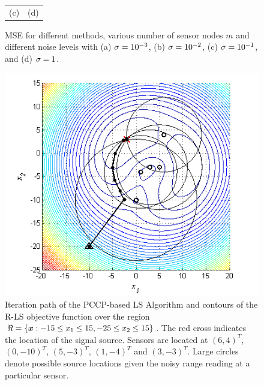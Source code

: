 \begin{figure}[t]
\begin{tabular}{cc}
    \\  (c)&  (d)   \\
\end{tabular}
\caption{MSE for different methods, various number of sensor nodes $m$ and different noise levels with (a) $\protect\sigma = 10\protect^{-3}$, (b) $\protect\sigma = 10\protect^{-2}$, (c) $\protect\sigma = 10\protect^{-1}$, and (d) $\protect\sigma = 1$.} \label{fig:MSE}
\end{figure}

\begin{figure} 
\centering
\includegraphics{figures/ccp/iteration_path2}
\caption{Iteration path of the PCCP-based LS Algorithm and contours of the R-LS objective function over the region $\protect\Re = \protect\lbrace \protect\mbox{\boldmath$x$}:-15\protect\leq x_1 \protect\leq 15, -25\protect\leq x_2 \protect\leq 15 \protect\rbrace$. The red cross indicates the location of the signal source. Sensors are located at $(6,4)^T$, $(0,-10)^T$, $(5,-3)^T$, $(1,-4)^T$ and  $(3,-3)^T$. Large circles denote possible source locations given the noisy range reading at a particular sensor.}
\label{fig:path}
\end{figure}

